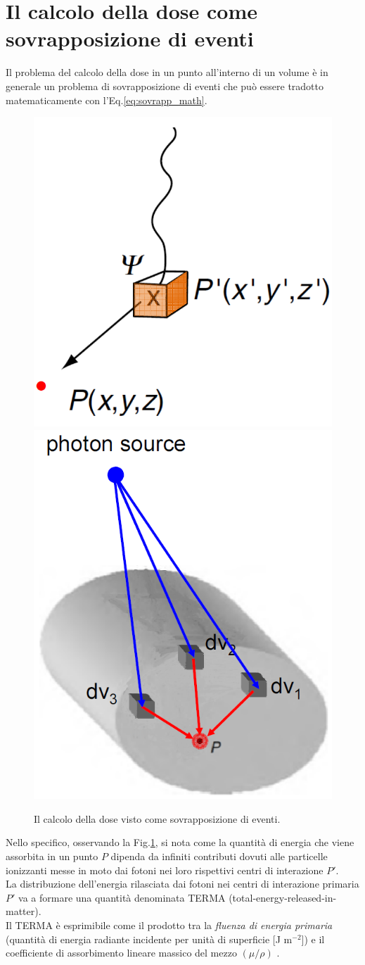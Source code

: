 {\section{Il calcolo della dose come sovrapposizione di eventi}
\label{sec:teoria_conv}
Il problema del calcolo della dose in un punto all'interno di un volume è in generale un problema di sovrapposizione di eventi che può essere tradotto matematicamente con l'Eq.\eqref{eq:sovrapp_math}.
\begin{figure}
\centering
\includegraphics[width=.45\textwidth]{./cap1/superp1.png}
\includegraphics[width=.45\textwidth]{./cap1/superp2.png}
\caption{Il calcolo della dose visto come sovrapposizione di eventi.}
\label{fig:superp}
\end{figure}

Nello specifico, osservando la Fig.\ref{fig:superp}, si nota come la quantità di energia che viene assorbita in un punto $P$ dipenda da infiniti contributi dovuti alle particelle ionizzanti messe in moto dai fotoni nei loro rispettivi centri di interazione $P'$.\\
La distribuzione dell'energia rilasciata dai fotoni nei centri di interazione primaria $P'$ va a formare una quantità denominata TERMA (total-energy-released-in-matter).  \\
Il TERMA è esprimibile come il prodotto tra la \textit{fluenza di energia primaria} (quantità di energia radiante incidente per unità di superficie [J m$^{-2}$]) e il coefficiente di assorbimento lineare massico del mezzo $(\mu/\rho)$ \cite{Ahnesjo1987}.

}
